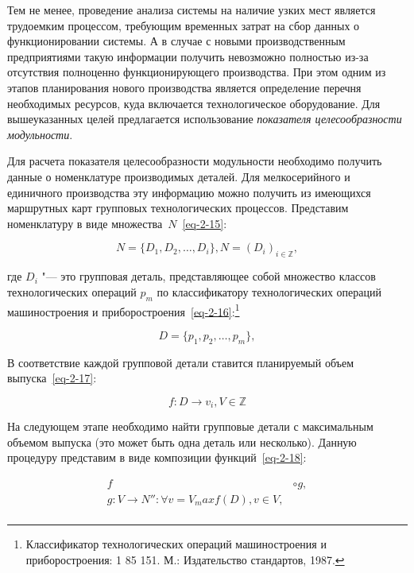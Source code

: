 Тем не менее, проведение анализа системы на наличие узких мест является трудоемким процессом, требующим временных затрат на сбор данных о функционировании системы. А в случае с новыми производственным предприятиями такую информации получить невозможно полностью из-за отсутствия полноценно функционирующего производства. При этом одним из этапов планирования нового производства является определение перечня необходимых ресурсов, куда включается технологическое оборудование. Для вышеуказанных целей предлагается использование \textit{показателя целесообразности модульности}. 

Для расчета показателя целесообразности модульности необходимо получить данные о номенклатуре производимых деталей. Для мелкосерийного и единичного производства эту информацию можно получить из имеющихся маршрутных карт групповых технологических процессов. Представим номенклатуру в виде множества~$N$~\cref{eq-2-15}:

\begin{equation}
N = \{D_1, D_2, \ldots, D_i\}, N = (D_i)_{i \in \mathbb{Z}},
\label{eq-2-15}
\end{equation}


где $D_i$ "--- это групповая деталь, представляющее собой множество классов технологических операций $p_m$ по классификатору технологических операций машиностроения и приборостроения~\cref{eq-2-16}:\footnote{Классификатор технологических операций машиностроения и приборостроения: 1 85 151. М.: Издательство стандартов, 1987.}

\begin{equation}
D = \{p_1, p_2, \ldots, p_m\},
\label{eq-2-16}
\end{equation}

\noindent В соответствие каждой групповой детали ставится планируемый объем выпуска~\cref{eq-2-17}:

\begin{equation}
f: D \rightarrow v_i, V \in \mathbb{Z}
\label{eq-2-17}
\end{equation}

На следующем этапе необходимо найти групповые детали с максимальным объемом выпуска (это может быть одна деталь или несколько). Данную процедуру представим в виде композиции функций~\cref{eq-2-18}:

\begin{equation}
\begin{split}
f &\circ g, \\
g: V \rightarrow N'': \forall v = V_max f(D), v \in V, \\
\end{split}
\label{eq-2-18}
\end{equation}

